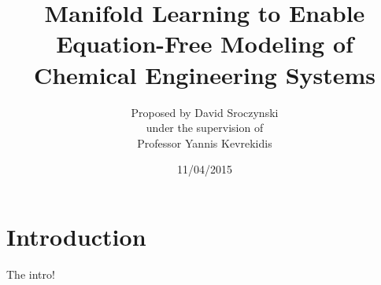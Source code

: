 \documentclass[12pt]{article}
\begin{document}
\title{Manifold Learning to Enable Equation-Free Modeling of Chemical Engineering Systems}
\author{\LARGE Proposed by David Sroczynski\vspace{3mm}\\\Large under the supervision of\vspace{3mm}\\\LARGE Professor Yannis Kevrekidis}
\date{11/04/2015}
\maketitle

\clearpage
\tableofcontents
\clearpage
\section{Introduction}
The intro! \cite{Lim2015} \cite{Chiavazzo2014}



\end{document}
